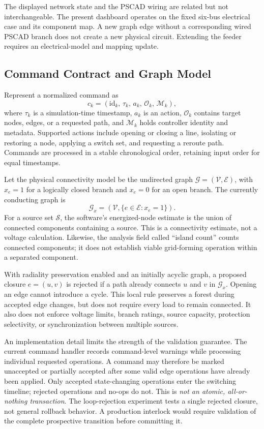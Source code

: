 The displayed network state and the PSCAD wiring are related but not
interchangeable. The present dashboard operates on the fixed six-bus electrical
case and its component map. A new graph edge without a corresponding wired
PSCAD branch does not create a new physical circuit. Extending the feeder
requires an electrical-model and mapping update.

\subsection{Command Contract and Graph Model}
Represent a normalized command as
\begin{equation}
 c_k = (\mathrm{id}_k,\,\tau_k,\,a_k,\,\mathcal{O}_k,\,\mathcal{M}_k),
\end{equation}
where $\tau_k$ is a simulation-time timestamp, $a_k$ is an action,
$\mathcal{O}_k$ contains target nodes, edges, or a requested path, and
$\mathcal{M}_k$ holds controller identity and metadata. Supported actions
include opening or closing a line, isolating or restoring a node, applying
a switch set, and requesting a reroute path. Commands are processed in a
stable chronological order, retaining input order for equal timestamps.

Let the physical connectivity model be the undirected graph
$\mathcal{G}=(\mathcal{V},\mathcal{E})$, with $x_e=1$ for a logically closed
branch and $x_e=0$ for an open branch. The currently conducting graph is
\begin{equation}
 \mathcal{G}_x = (\mathcal{V},\{e\in\mathcal{E}:x_e=1\}).
\end{equation}
For a source set $\mathcal{S}$, the software's energized-node estimate is the
union of connected components containing a source. This is a connectivity
estimate, not a voltage calculation. Likewise, the analysis field called
``island count'' counts connected components; it does not establish viable
grid-forming operation within a separated component.

With radiality preservation enabled and an initially acyclic graph, a proposed
closure $e=(u,v)$ is rejected if a path already connects $u$ and $v$ in
$\mathcal{G}_x$. Opening an edge cannot introduce a cycle. This local rule
preserves a forest during accepted edge changes, but does not require every
load to remain connected. It also does not enforce voltage limits, branch
ratings, source capacity, protection selectivity, or synchronization between
multiple sources.

An implementation detail limits the strength of the validation guarantee.
The current command handler records command-level warnings while processing
individual requested operations. A command may therefore be marked
unaccepted or partially accepted after some valid edge operations have already
been applied. Only accepted state-changing operations enter the switching
timeline; rejected operations and no-ops do not. This is
\emph{not an atomic, all-or-nothing transaction}. The loop-rejection experiment
tests a single rejected closure, not general rollback behavior. A production
interlock would require validation of the complete prospective transition
before committing it.

